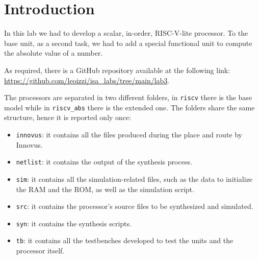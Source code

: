 \chapter{Introduction}

In this lab we had to develop a scalar, in-order, RISC-V-lite processor. To the base unit, as a second task,
we had to add a special functional unit to compute the absolute value of a number.

As required, there is a GitHub repository available at the following link: \url{https://github.com/leoizzi/isa_labs/tree/main/lab3}.

The processors are separated in two different folders, in \verb|riscv| there is the base model while in \verb|riscv_abs| there is
the extended one. The folders share the same structure, hence it is reported only once:

\begin{itemize}
    \item \verb|innovus|: it contains all the files produced during the place and route by Innovus.
    \item \verb|netlist|: it contains the output of the synthesis process.
    \item \verb|sim|: it contains all the simulation-related files, such as the data to initialize the RAM and the ROM, as well as the simulation script.
    \item \verb|src|: it contains the processor's source files to be synthesized and simulated.
    \item \verb|syn|: it contains the synthesis scripts.
    \item \verb|tb|: it contains all the testbenches developed to test the units and the processor itself.
\end{itemize}
